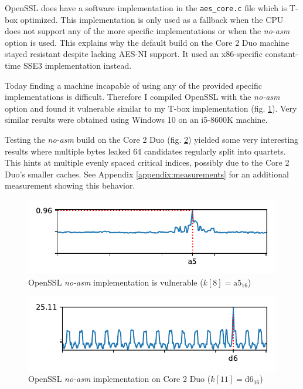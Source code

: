 \documentclass[thesis=B,english]{FITthesis}[2019/03/06]
\begin{document}
OpenSSL does have a software implementation in the \verb'aes_core.c' file which is T-box optimized.
This implementation is only used as a fallback when the CPU does not support any of the more specific implementations or when the \textit{no-asm} option is used.
This explains why the default build on the Core 2 Duo machine stayed resistant despite lacking AES-NI support. It used an x86-specific constant-time SSE3 implementation instead.

Today finding a machine incapable of using any of the provided specific implementations is difficult.
Therefore I compiled OpenSSL with the \textit{no-asm} option and found it vulnerable similar to my T-box implementation (fig. \ref{fig:openssl_noasm_singlebyte}).
Very similar results were obtained using Windows 10 on an i5-8600K machine.

Testing the \textit{no-asm} build on the Core 2 Duo (fig. \ref{fig:openssl_noasm_coreduo_singlebyte}) yielded some very interesting results where multiple bytes leaked 64 candidates regularly split into quartets.
This hints at multiple evenly spaced critical indices, possibly due to the Core 2 Duo's smaller caches. See Appendix \ref{appendix:measurements} for an additional measurement showing this behavior.

\begin{figure}
	\centering
	\includegraphics{openssl_noasm_laptop_byte.pdf}
	\caption{OpenSSL \textit{no-asm} implementation is vulnerable ($k[8] = \text{a5}_{16}$)}
	\label{fig:openssl_noasm_singlebyte}
\end{figure}

\begin{figure}
	\centering
	\includegraphics{openssl_noasm_core2duo_byte.pdf}
	\caption{OpenSSL \textit{no-asm} implementation on Core 2 Duo ($k[11] = \text{d6}_{16}$)}
	\label{fig:openssl_noasm_coreduo_singlebyte}
\end{figure}
\end{document}
